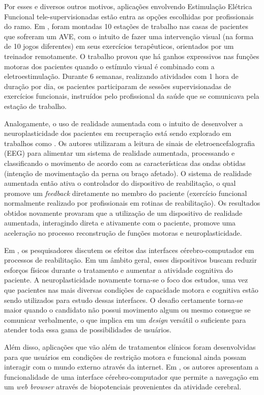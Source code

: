 \documentclass[rascunho,xindy]{fei}
\begin{document}
Por esses e diversos outros motivos, aplicações envolvendo Estimulação Elétrica Funcional tele-supervisionadas estão entra as opções escolhidas por profissionais do ramo. Em \cite{buick2016tele}, foram montadas 10 estações de trabalho nas casas de pacientes que sofreram um AVE, com o intuito de fazer uma intervenção visual (na forma de 10 jogos diferentes) em seus exercícios terapêuticos, orientados por um treinador remotamente. O trabalho provou que há ganhos expressivos nas funções motoras dos pacientes quando o estímulo visual é combinado com a eletroestimulação. Durante 6 semanas, realizando atividades com 1 hora de duração por dia, os pacientes participaram de sessões supervisionadas de exercícios funcionais, instruídos pelo profissional da saúde que se comunicava pela estação de trabalho.

Analogamente, o uso de realidade aumentada com o intuito de desenvolver a neuroplasticidade dos pacientes em recuperação está sendo explorado em trabalhos como \cite{triponyuwasin2014brain}. Os autores utilizaram a leitura de sinais de eletroencefalografia (EEG) para alimentar um sistema 	de realidade aumentada, processando e classificando o movimento de acordo com as características das ondas obtidas (intenção de movimentação da perna ou braço afetado). O sistema de realidade aumentada então ativa o controlador do dispositivo de reabilitação, o qual promove um \textit{feedback} diretamente no membro do paciente (exercício funcional normalmente realizado por profissionais em rotinas de reabilitação). Os resultados obtidos novamente provaram que a utilização de um dispositivo de realidade aumentada, interagindo direta e ativamente com o paciente, promove uma aceleração no processo reconstrução de funções motoras e neuroplasticidade.

Em \cite{dobkin2007brain}, os pesquisadores  discutem os efeitos das interfaces cérebro-computador em processos de reabilitação. Em um âmbito geral, esses dispositivos buscam reduzir esforços físicos durante o tratamento e aumentar a atividade cognitiva do paciente. A neuroplasticidade novamente torna-se o foco dos estudos, uma vez que  pacientes nas mais diversas condições de capacidade motora e cognitiva estão sendo utilizados para estudo dessas interfaces. O desafio certamente torna-se maior quando o candidato não possui movimento algum ou mesmo consegue se comunicar verbalmente, o que implica em um \textit{design} versátil o suficiente para atender toda essa gama de possibilidades de usuários. 

Além disso, aplicações que vão além de tratamentos clínicos foram desenvolvidas para que usuários em condições de restrição motora e funcional ainda possam interagir com o mundo externo através da internet. Em \cite{karim2006neural}, os autores apresentam a funcionalidade de uma interface cérebro-computador que permite a navegação em um \textit{web browser} através de biopotenciais provenientes da atividade cerebral. 
\end{document}
